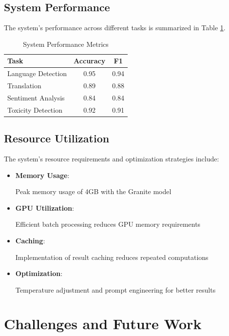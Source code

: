 \documentclass[11pt]{article}
\begin{document}
\subsection{System Performance}
The system's performance across different tasks is summarized in Table \ref{tab:performance}.

\begin{table}[h]
\centering
\begin{tabular}{@{}lcc@{}}
\toprule
\textbf{Task} & \textbf{Accuracy} & \textbf{F1} \\
\midrule
Language Detection & 0.95 & 0.94 \\
Translation & 0.89 & 0.88 \\
Sentiment Analysis & 0.84 & 0.84 \\
Toxicity Detection & 0.92 & 0.91 \\
\bottomrule
\end{tabular}
\caption{System Performance Metrics}
\label{tab:performance}
\end{table}

\subsection{Resource Utilization}
The system's resource requirements and optimization strategies include:

\begin{itemize}
    \item \textbf{Memory Usage}: 
    
    Peak memory usage of 4GB with the Granite model
    \item \textbf{GPU Utilization}: 
    
    Efficient batch processing reduces GPU memory requirements
    \item \textbf{Caching}: 
    
    Implementation of result caching reduces repeated computations
    \item \textbf{Optimization}: 
    
    Temperature adjustment and prompt engineering for better results
\end{itemize}

\section{Challenges and Future Work}
\end{document}
